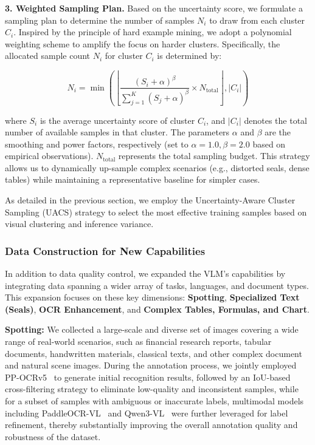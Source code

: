 \documentclass[11pt, a4paper,logo,  copyright, nonumbering]{paddleocr}
\begin{document}
\textbf{3. Weighted Sampling Plan.} 
Based on the uncertainty score, we formulate a sampling plan to determine the number of samples $N_i$ to draw from each cluster $C_i$. Inspired by the principle of hard example mining, we adopt a polynomial weighting scheme to amplify the focus on harder clusters. Specifically, the allocated sample count $N_i$ for cluster $C_i$ is determined by:

\begin{equation}
    N_i = \min \left( \left\lfloor \frac{(S_i + \alpha)^\beta}{\sum_{j=1}^{K} (S_j + \alpha)^\beta} \times N_{\text{total}} \right\rfloor, |C_i| \right)
\end{equation}

where $S_i$ is the average uncertainty score of cluster $C_i$, and $|C_i|$ denotes the total number of available samples in that cluster. The parameters $\alpha$ and $\beta$ are the smoothing and power factors, respectively (set to $\alpha=1.0, \beta=2.0$ based on empirical observations). $N_{\text{total}}$ represents the total sampling budget. This strategy allows us to dynamically up-sample complex scenarios (e.g., distorted seals, dense tables) while maintaining a representative baseline for simpler cases.

As detailed in the previous section, we employ the Uncertainty-Aware Cluster Sampling (UACS) strategy to select the most effective training samples based on visual clustering and inference variance.

\subsubsection{Data Construction for New Capabilities}
\label{new_capability_data}

In addition to data quality control, we expanded the VLM's capabilities by integrating data spanning a wider array of tasks, languages, and document types. This expansion focuses on these key dimensions: \textbf{Spotting}, \textbf{Specialized Text (Seals)}, \textbf{OCR Enhancement}, and \textbf{Complex Tables, Formulas, and Chart}.

\textbf{Spotting:} We collected a large-scale and diverse set of images covering a wide range of real-world scenarios, such as financial research reports, tabular documents, handwritten materials, classical texts, and other complex document and natural scene images.  During the annotation process, we jointly employed PP-OCRv5~\cite{cui2025paddleocr} to generate initial recognition results, followed by an IoU-based cross-filtering strategy to eliminate low-quality and inconsistent samples, while for a subset of samples with ambiguous or inaccurate labels, multimodal models including PaddleOCR-VL~\cite{cui2025paddleocrvl} and Qwen3-VL~\cite{yang2025qwen3} were further leveraged for label refinement, thereby substantially improving the overall annotation quality and robustness of the dataset.
\end{document}
